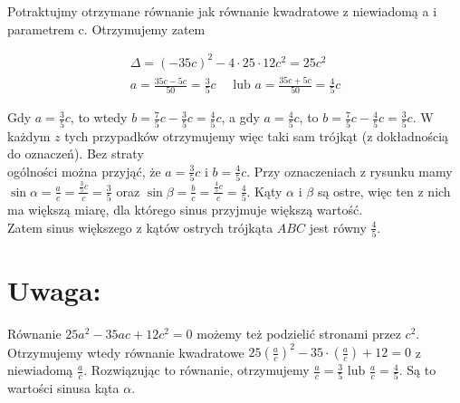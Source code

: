 \documentclass[10pt]{article}
\begin{document}
Potraktujmy otrzymane równanie jak równanie kwadratowe z niewiadomą a i parametrem c. Otrzymujemy zatem

$$
\begin{gathered}
\Delta=(-35 c)^{2}-4 \cdot 25 \cdot 12 c^{2}=25 c^{2} \\
a=\frac{35 c-5 c}{50}=\frac{3}{5} c \quad \text { lub } a=\frac{35 c+5 c}{50}=\frac{4}{5} c
\end{gathered}
$$

Gdy $a=\frac{3}{5} c$, to wtedy $b=\frac{7}{5} c-\frac{3}{5} c=\frac{4}{5} c$, a gdy $a=\frac{4}{5} c$, to $b=\frac{7}{5} c-\frac{4}{5} c=\frac{3}{5} c$. W każdym $z$ tych przypadków otrzymujemy więc taki sam trójkąt (z dokładnością do oznaczeń). Bez straty\\
ogólności można przyjąć, że $a=\frac{3}{5} c$ i $b=\frac{4}{5} c$. Przy oznaczeniach z rysunku mamy $\sin \alpha=\frac{a}{c}=\frac{\frac{3}{5} c}{c}=\frac{3}{5}$ oraz $\sin \beta=\frac{b}{c}=\frac{\frac{4}{5} c}{c}=\frac{4}{5}$. Kąty $\alpha$ i $\beta$ są ostre, więc ten z nich ma większą miarę, dla którego sinus przyjmuje większą wartość.\\
Zatem sinus większego z kątów ostrych trójkąta $A B C$ jest równy $\frac{4}{5}$.

\section*{Uwaga:}
Równanie $25 a^{2}-35 a c+12 c^{2}=0$ możemy też podzielić stronami przez $c^{2}$. Otrzymujemy wtedy równanie kwadratowe $25\left(\frac{a}{c}\right)^{2}-35 \cdot\left(\frac{a}{c}\right)+12=0$ z niewiadomą $\frac{a}{c}$. Rozwiązując to równanie, otrzymujemy $\frac{a}{c}=\frac{3}{5}$ lub $\frac{a}{c}=\frac{4}{5}$. Są to wartości sinusa kąta $\alpha$.
\end{document}
